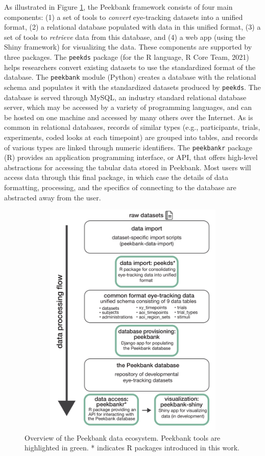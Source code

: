 \documentclass[
  english,
  man,floatsintext]{apa6}
\begin{document}
As illustrated in Figure \ref{fig:fig-framework-overview}, the Peekbank framework consists of four main components: (1) a set of tools to \emph{convert} eye-tracking datasets into a unified format, (2) a relational database populated with data in this unified format, (3) a set of tools to \emph{retrieve} data from this database, and (4) a web app (using the Shiny framework) for visualizing the data.
These components are supported by three packages.
The \texttt{peekds} package (for the R language, R Core Team, 2021) helps researchers convert existing datasets to use the standardized format of the database.
The \texttt{peekbank} module (Python) creates a database with the relational schema and populates it with the standardized datasets produced by \texttt{peekds}.
The database is served through MySQL, an industry standard relational database server, which may be accessed by a variety of programming languages, and can be hosted on one machine and accessed by many others over the Internet.
As is common in relational databases, records of similar types (e.g., participants, trials, experiments, coded looks at each timepoint) are grouped into tables, and records of various types are linked through numeric identifiers.
The \texttt{peekbankr} package (R) provides an application programming interface, or API, that offers high-level abstractions for accessing the tabular data stored in Peekbank.
Most users will access data through this final package, in which case the details of data formatting, processing, and the specifics of connecting to the database are abstracted away from the user.

\begin{figure}

{\centering \includegraphics[width=18in,height=4.5in]{brm/figures/peekbankflowchartv6}

}

\caption{Overview of the Peekbank data ecosystem. Peekbank tools are highlighted in green. * indicates R packages introduced in this work.}\label{fig:fig-framework-overview}
\end{figure}
\end{document}
